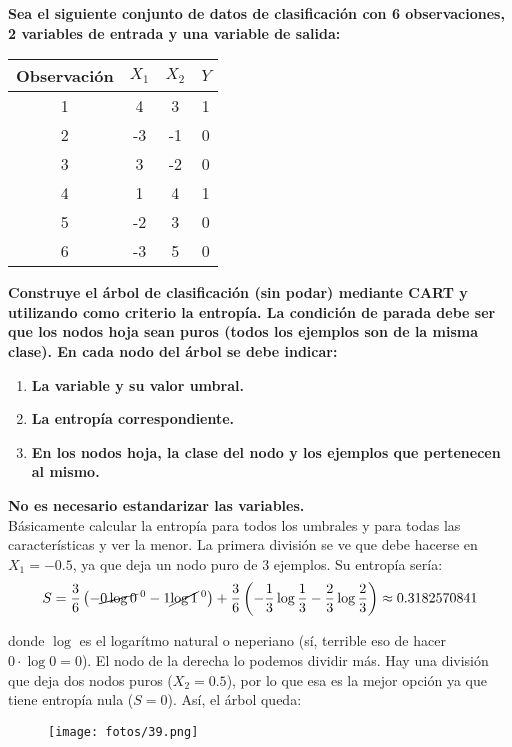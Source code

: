 \begin{example}
\textbf{Sea el siguiente conjunto de datos de clasificación con 6 observaciones, 2 variables de entrada y una variable de salida:}
\begin{table}[H]
\centering
\begin{tabular}{cccc}
\hline \hline
Observación & $X_1$ & $X_2$ & $Y$ \\ \hline \hline
1 & 4 & 3 & 1 \\
2 & -3 & -1 & 0 \\
3 & 3 & -2 & 0 \\
4 & 1 & 4 & 1 \\
5 & -2 & 3 & 0 \\
6 & -3 & 5 & 0 \\ \hline
\end{tabular}
\end{table}
\textbf{Construye el árbol de clasificación (sin podar) mediante CART y utilizando como criterio la entropía. La condición de parada debe ser que los nodos hoja sean puros (todos los ejemplos son de la misma clase). En cada nodo del árbol se debe indicar:}
\begin{enumerate}
\item \textbf{La variable y su valor umbral.}
\item \textbf{La entropía correspondiente.}
\item \textbf{En los nodos hoja, la clase del nodo y los ejemplos que pertenecen al mismo.}
\end{enumerate}
\textbf{No es necesario estandarizar las variables.} \\

Básicamente calcular la entropía para todos los umbrales y para todas las características y ver la menor. La primera división se ve que debe hacerse en $X_1 = -0.5$, ya que deja un nodo puro de 3 ejemplos. Su entropía sería:
\begin{equation}
S = \frac{3}{6}\left(-\cancel{0\log 0}^{\; 0} - 1\cancel{\log 1}^{\; 0}\right) + \frac{3}{6}\left(-\frac{1}{3}\log \frac{1}{3} - \frac{2}{3}\log \frac{2}{3}\right) \approx 0.3182570841
\end{equation}

\noindent donde $\log$ es el logarítmo natural o neperiano (sí, terrible eso de hacer $0\cdot \log 0 = 0$). El nodo de la derecha lo podemos dividir más. Hay una división que deja dos nodos puros ($X_2 = 0.5$), por lo que esa es la mejor opción ya que tiene entropía nula ($S = 0$). Así, el árbol queda:
\begin{figure}[H]
\centering
\texttt{[image: fotos/39.png]}
\end{figure}
\end{example}